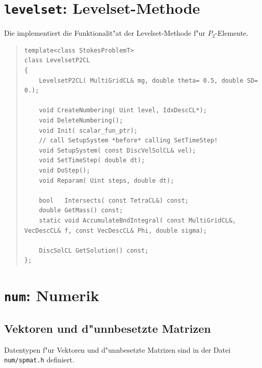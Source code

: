 \documentclass[11pt,a4paper]{article}
\newenvironment{Code}{\begin{quote}\scriptsize}{\end{quote}}
\begin{document}
\section{{\tt levelset}: Levelset-Methode}

Die  implementiert die Funktionalit"at der Levelset-Methode
f"ur $P_2$-Elemente. 

\begin{Code}
\begin{verbatim}
template<class StokesProblemT>
class LevelsetP2CL
{
    LevelsetP2CL( MultiGridCL& mg, double theta= 0.5, double SD= 0.);
    
    void CreateNumbering( Uint level, IdxDescCL*);
    void DeleteNumbering();
    void Init( scalar_fun_ptr);
    // call SetupSystem *before* calling SetTimeStep!
    void SetupSystem( const DiscVelSolCL& vel);
    void SetTimeStep( double dt);
    void DoStep();
    void Reparam( Uint steps, double dt);
    
    bool   Intersects( const TetraCL&) const;
    double GetMass() const;
    static void AccumulateBndIntegral( const MultiGridCL&, VecDescCL& f, const VecDescCL& Phi, double sigma);
    
    DiscSolCL GetSolution() const;
};
\end{verbatim}
\end{Code}

\section{{\tt num}: Numerik}

\subsection{Vektoren und d"unnbesetzte Matrizen}

Datentypen f"ur Vektoren und d"unnbesetzte Matrizen sind in der Datei
\verb|num/spmat.h| definiert.
\end{document}
